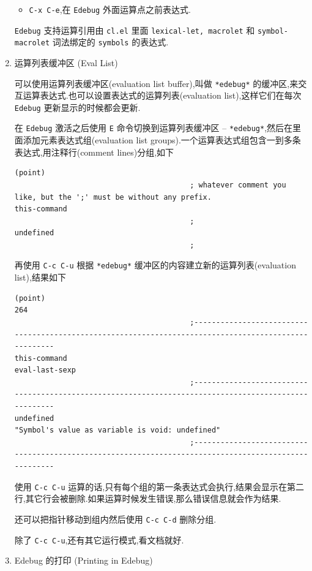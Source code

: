 \documentclass[11pt]{article}
\begin{document}
\begin{enumerate}
\begin{itemize}
\item \texttt{C-x C-e},在 \texttt{Edebug} 外面运算点之前表达式.
\end{itemize}

\texttt{Edebug} 支持运算引用由 \texttt{cl.el} 里面 \texttt{lexical-let, macrolet} 和 \texttt{symbol-macrolet} 词法绑定的 \texttt{symbols} 的表达式.


\item 运算列表缓冲区 (Eval List)
\label{sec:org5d95f89}

可以使用运算列表缓冲区(evaluation list buffer),叫做 \texttt{*edebug*} 的缓冲区,来交互运算表达式.也可以设置表达式的运算列表(evaluation list),这样它们在每次 \texttt{Edebug} 更新显示的时候都会更新.

在 \texttt{Edebug} 激活之后使用 \texttt{E} 命令切换到运算列表缓冲区 -- \texttt{*edebug*},然后在里面添加元素表达式组(evaluation list groups).一个运算表达式组包含一到多条表达式,用注释行(comment lines)分组,如下

\begin{verbatim}
(point)
                                        ; whatever comment you like, but the ';' must be without any prefix.
this-command
                                        ;
undefined
                                        ;
\end{verbatim}

再使用 \texttt{C-c C-u} 根据 \texttt{*edebug*} 缓冲区的内容建立新的运算列表(evaluation list),结果如下

\begin{verbatim}
(point)
264
                                        ;------------------------------------------------------------------------------------------------------
this-command
eval-last-sexp
                                        ;------------------------------------------------------------------------------------------------------
undefined
"Symbol's value as variable is void: undefined"
                                        ;------------------------------------------------------------------------------------------------------
\end{verbatim}

使用 \texttt{C-c C-u} 运算的话,只有每个组的第一条表达式会执行,结果会显示在第二行,其它行会被删除.如果运算时候发生错误,那么错误信息就会作为结果.

还可以把指针移动到组内然后使用 \texttt{C-c C-d} 删除分组.

除了 \texttt{C-c C-u},还有其它运行模式,看文档就好.


\item Edebug 的打印 (Printing in Edebug)
\label{sec:orgc31eb54}


\end{enumerate}
\end{document}
